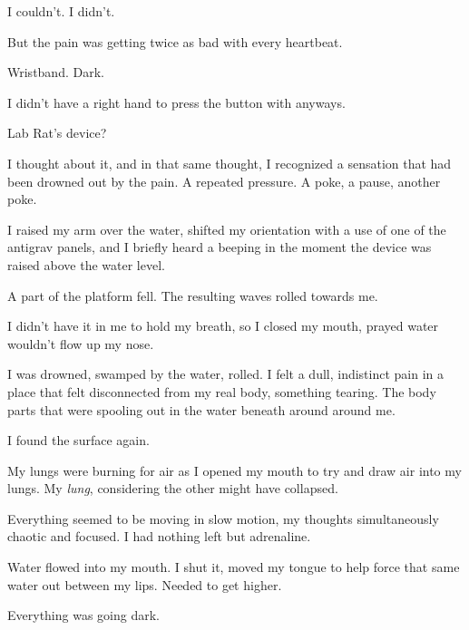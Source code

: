 I couldn't.  I didn't.



But the pain was getting twice as bad with every heartbeat.



Wristband.  Dark.



I didn't have a right hand to press the button with anyways.



Lab Rat's device?



I thought about it, and in that same thought, I recognized a sensation that had been drowned out by the pain.  A repeated pressure.  A poke, a pause, another poke.



I raised my arm over the water, shifted my orientation with a use of one of the antigrav panels, and I briefly heard a beeping in the moment the device was raised above the water level.



A part of the platform fell.  The resulting waves rolled towards me.



I didn't have it in me to hold my breath, so I closed my mouth, prayed water wouldn't flow up my nose.



I was drowned, swamped by the water, rolled.  I felt a dull, indistinct pain in a place that felt disconnected from my real body, something tearing.  The body parts that were spooling out in the water beneath around around me.



I found the surface again.



My lungs were burning for air as I opened my mouth to try and draw air into my lungs.  My \emph{lung}, considering the other might have collapsed.



Everything seemed to be moving in slow motion, my thoughts simultaneously chaotic and focused.  I had nothing left but adrenaline.



Water flowed into my mouth.  I shut it, moved my tongue to help force that same water out between my lips.  Needed to get higher.



Everything was going dark.



